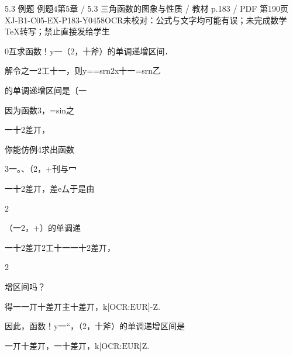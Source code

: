 \begin{bankitem}{5.3 例题 例题4}{第5章 / 5.3 三角函数的图象与性质 / 教材 p.183 / PDF 第190页}{XJ-B1-C05-EX-P183-Y0458}{OCR未校对：公式与文字均可能有误；未完成数学TeX转写；禁止直接发给学生}
\begin{ocrdraft}
\par
0互求函数！y一（2，十斧）的单调递增区间．
\par
解令之一2工十一，则y==srn2x十一=srn乙
\par
的单调递增区间是〔一
\par
因为函数3，=sin之
\par
一十2差丌，
\par
你能仿例4求出函数
\par
3一。、（2，+刊与冖
\par
一十2差丌，差e厶于是由
\par
2
\par
（一2，+）的单调递
\par
一十2差丌2工十一一十2差丌，
\par
2
\par
增区间吗？
\par
得一一丌十差丌主十差丌，k\ensuremath{\text{[OCR:EUR]}}-Z.
\par
因此，函数！y一“，（2，十斧）的单调递增区间是
\par
一丌十差丌，一十差丌，k\ensuremath{\text{[OCR:EUR]}}Z.
\end{ocrdraft}
\end{bankitem}
